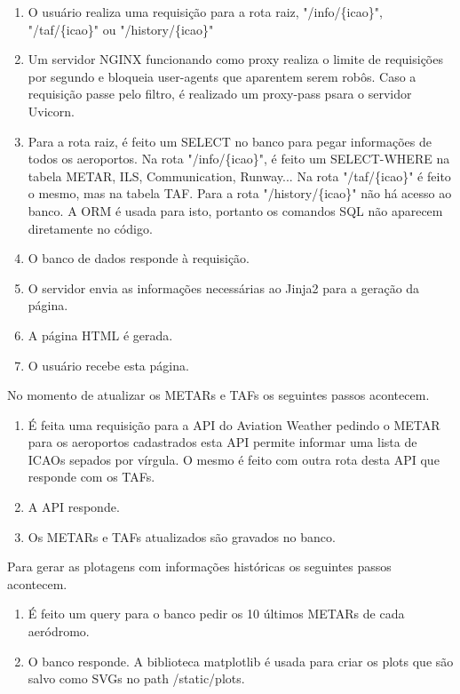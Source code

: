 \begin{enumerate}
\item O usuário realiza uma requisição para a rota raiz, "/info/\{icao\}", "/taf/\{icao\}"
ou "/history/\{icao\}"
\item Um servidor NGINX funcionando como proxy realiza o limite de requisições por segundo
e bloqueia user-agents que aparentem serem robôs. Caso a requisição passe pelo filtro, é
realizado um proxy-pass psara o servidor Uvicorn.
\item Para a rota raiz, é feito um SELECT no banco para pegar informações de todos os
aeroportos. Na rota "/info/\{icao\}", é feito um SELECT-WHERE na tabela METAR, ILS, Communication, Runway...
Na rota "/taf/\{icao\}" é feito o mesmo, mas na tabela TAF. Para a rota "/history/\{icao\}"
não há acesso ao banco.
A ORM é usada para isto, portanto os comandos SQL não aparecem diretamente no código.
\item O banco de dados responde à requisição.
\item O servidor envia as informações necessárias ao Jinja2 para a geração da página.
\item A página HTML é gerada.
\item O usuário recebe esta página.
\end{enumerate}

No momento de atualizar os METARs e TAFs os seguintes passos acontecem.

\begin{enumerate}
\item É feita uma requisição para a API do Aviation Weather pedindo o METAR para os aeroportos
cadastrados esta API permite informar uma lista de ICAOs sepados por vírgula.
O mesmo é feito com outra rota desta API que responde com os TAFs.
\item A API responde.
\item Os METARs e TAFs atualizados são gravados no banco.
\end{enumerate}

Para gerar as plotagens com informações históricas os seguintes passos acontecem.
\begin{enumerate}
    \item É feito um query para o banco pedir os 10 últimos METARs de cada aeródromo.
    \item O banco responde. A biblioteca matplotlib é usada para criar os plots que são salvo como SVGs 
    no path /static/plots.
\end{enumerate}